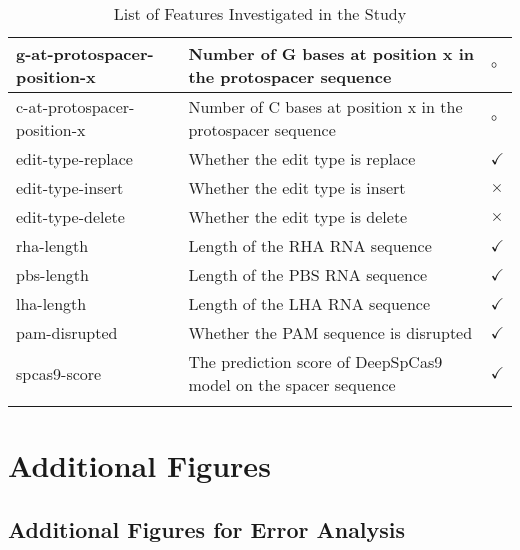 \begin{longtable}{|p{}|p{}|p{}|}
    \hline
    g-at-protospacer-position-x & Number of G bases at position x in the protospacer sequence & $\circ$ \\
    \hline
    c-at-protospacer-position-x & Number of C bases at position x in the protospacer sequence & $\circ$ \\
    \hline
    edit-type-replace & Whether the edit type is replace & $\checkmark$ \\
    \hline
    edit-type-insert & Whether the edit type is insert & $\times$ \\
    \hline
    edit-type-delete & Whether the edit type is delete & $\times$ \\
    \hline
    rha-length & Length of the RHA RNA sequence & $\checkmark$ \\
    \hline
    pbs-length & Length of the PBS RNA sequence & $\checkmark$ \\
    \hline
    lha-length & Length of the LHA RNA sequence & $\checkmark$ \\
    \hline
    pam-disrupted & Whether the PAM sequence is disrupted & $\checkmark$ \\
    \hline
    spcas9-score & The prediction score of DeepSpCas9 model on the spacer sequence & $\checkmark$ \\
    \hline
    \caption{List of Features Investigated in the Study}
    \label{table:features}
\end{longtable}


\chapter{Additional Figures}
\label{appendix:additional-figures}

\section{Additional Figures for Error Analysis}
\label{appendix:error-analysis-figures}



